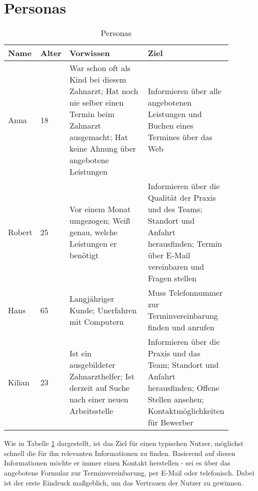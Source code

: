 \section{Personas} \label{sec:personas}

\begin{table}[h!]
\centering
\begin{tabular}{|p{0.08\linewidth}|p{0.07\linewidth}|p{0.37\linewidth}|p{0.37\linewidth}|}
\hline
\textbf{Name} & \textbf{Alter} & \textbf{Vorwissen} & \textbf{Ziel} \\ \hline

Anna & 18 & War schon oft als Kind bei diesem Zahnarzt; Hat noch nie selber einen Termin beim Zahnarzt ausgemacht; Hat keine Ahnung über angebotene Leistungen & Informieren über alle angebotenen Leistungen und Buchen eines Termines über das Web \\ \hline

Robert & 25 & Vor einem Monat umgezogen; Weiß genau, welche Leistungen er benötigt & Informieren über die Qualität der Praxis und des Teams; Standort und Anfahrt herausfinden; Termin über E-Mail vereinbaren und Fragen stellen \\ \hline

Hans & 65 & Langjähriger Kunde; Unerfahren mit Computern & Muss Telefonnummer zur Terminvereinbarung finden und anrufen \\ \hline

Kilian & 23 & Ist ein ausgebildeter Zahnarzthelfer; Ist derzeit auf Suche nach einer neuen Arbeitsstelle & Informieren über die Praxis und das Team; Standort und Anfahrt herausfinden; Offene Stellen ansehen; Kontaktmöglichkeiten für Bewerber \\ \hline

\end{tabular}
\caption{Personas}
\label{tab:personas}
\end{table}

Wie in Tabelle \ref{tab:personas} dargestellt, ist das Ziel für einen typischen Nutzer, möglichst schnell die für ihn relevanten Informationen zu finden. Basierend auf diesen Informationen möchte er immer einen Kontakt herstellen - sei es über das angebotene Formular zur Terminvereinbarung, per E-Mail oder telefonisch. Dabei ist der erste Eindruck maßgeblich, um das Vertrauen der Nutzer zu gewinnen.